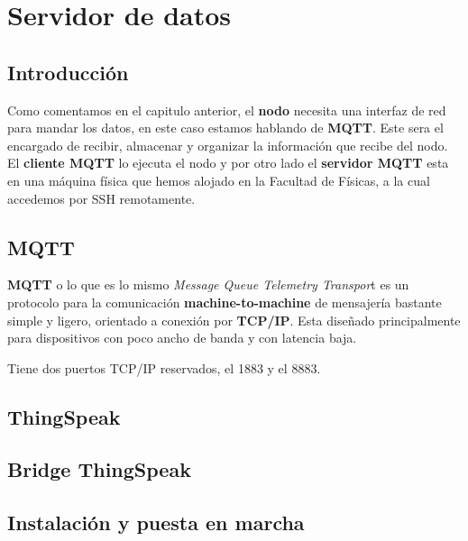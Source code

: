 \cleardoublepage

\chapter{Servidor de datos}
\label{makereference3}

\section{Introducción}
\label{makereference3.1}
Como comentamos en el capitulo anterior, el \textbf{nodo} necesita una interfaz de red para mandar los datos, en este caso estamos hablando de \textbf{MQTT}. Este sera el encargado de recibir, almacenar y organizar la información que recibe del nodo.
El \textbf{cliente MQTT} lo ejecuta el nodo y por otro lado el \textbf{servidor MQTT} esta en una máquina física que hemos alojado en la Facultad de Físicas, a la cual accedemos por SSH remotamente.

\section{MQTT}
\label{makereference3.2}
\textbf{MQTT} o lo que es lo mismo \textit{Message Queue Telemetry Transpor}t es un protocolo para la comunicación \textbf{machine-to-machine} de mensajería bastante simple y ligero, orientado a conexión por \textbf{TCP/IP}. Esta diseñado principalmente para dispositivos con poco ancho de banda y con latencia baja. 

Tiene dos puertos TCP/IP reservados, el 1883 y el 8883.

\section{ThingSpeak}
\label{makereference3.3}

\section{Bridge ThingSpeak}
\label{makereference3.4}

\section{Instalación y puesta en marcha}
\label{makereference3.5}